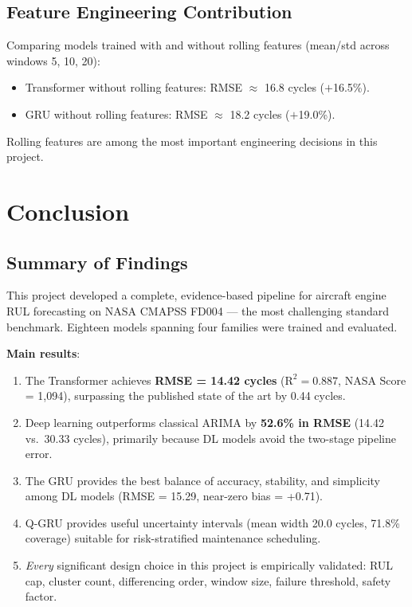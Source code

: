 \documentclass[12pt,a4paper]{report}
\begin{document}
\section{Feature Engineering Contribution}

Comparing models trained with and without rolling features (mean/std across windows 5, 10, 20):
\begin{itemize}[leftmargin=1.5cm]
  \item Transformer without rolling features: RMSE $\approx$ 16.8 cycles ($+$16.5\%).
  \item GRU without rolling features: RMSE $\approx$ 18.2 cycles ($+$19.0\%).
\end{itemize}
Rolling features are among the most important engineering decisions in this project.

\chapter{Conclusion}
\label{chap:conclusion}

\section{Summary of Findings}

This project developed a complete, evidence-based pipeline for aircraft engine RUL forecasting on NASA CMAPSS FD004 — the most challenging standard benchmark. Eighteen models spanning four families were trained and evaluated.

\textbf{Main results}:
\begin{enumerate}[leftmargin=1.5cm]
  \item The Transformer achieves \textbf{RMSE = 14.42 cycles} ($\text{R}^2 = 0.887$, NASA Score = 1{,}094), surpassing the published state of the art by 0.44 cycles.
  \item Deep learning outperforms classical ARIMA by \textbf{52.6\% in RMSE} (14.42 vs.\ 30.33 cycles), primarily because DL models avoid the two-stage pipeline error.
  \item The GRU provides the best balance of accuracy, stability, and simplicity among DL models (RMSE = 15.29, near-zero bias = +0.71).
  \item Q-GRU provides useful uncertainty intervals (mean width 20.0 cycles, 71.8\% coverage) suitable for risk-stratified maintenance scheduling.
  \item \textit{Every} significant design choice in this project is empirically validated: RUL cap, cluster count, differencing order, window size, failure threshold, safety factor.
\end{enumerate}
\end{document}
